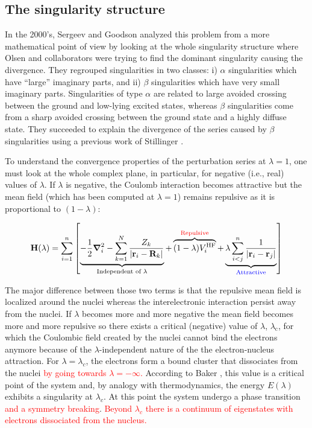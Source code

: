 \documentclass[11pt,a4paper]{article}
\newcommand{\titou}[1]{\textcolor{red}{#1}}
\newcommand{\bH}{\mathbf{H}}
\begin{document}
\subsection{The singularity structure}

In the 2000's, Sergeev and Goodson \cite{Sergeev_2005, Sergeev_2006} analyzed this problem from a more mathematical point of view by looking at the whole singularity structure where Olsen and collaborators were trying to find the dominant singularity causing the divergence. They regrouped singularities in two classes: i) $\alpha$ singularities which have ``large'' imaginary parts, and ii) $\beta$ singularities which have very small imaginary parts. Singularities of type $\alpha$ are related to large avoided crossing between the ground and low-lying excited states, whereas $\beta$ singularities come from a sharp avoided crossing between the ground state and a highly diffuse state. They succeeded to explain the divergence of the series caused by $\beta$ singularities using a previous work of Stillinger \cite{Stillinger_2000}. 

To understand the convergence properties of the perturbation series at $\lambda=1$, one must look at the whole complex plane, in particular, for negative (i.e., real) values of $\lambda$. If $\lambda$ is negative, the Coulomb interaction becomes attractive but the mean field (which has been computed at $\lambda = 1$) remains repulsive as it is proportional to $(1-\lambda)$:

\begin{equation}\label{eq:HamiltonianStillinger}
    \bH(\lambda)=\sum\limits_{i=1}^{n}\left[ \underbrace{-\frac{1}{2}\grad_i^2 - \sum\limits_{k=1}^{N} \frac{Z_k}{|\vb{r}_i-\vb{R}_k|}}_{\text{Independent of $\lambda$}} + \overbrace{(1-\lambda)V_i^{\text{HF}}}^{\textcolor{red}{\text{Repulsive}}}+\underbrace{\lambda\sum\limits_{i<j}^{n}\frac{1}{|\vb{r}_i-\vb{r}_j|}}_{\textcolor{blue}{\text{Attractive}}}  \right]
\end{equation}

The major difference between those two terms is that the repulsive mean field is localized around the nuclei whereas the interelectronic interaction persist away from the nuclei. If $\lambda$ becomes more and more negative the mean field becomes more and more repulsive so there exists a critical (negative) value of $\lambda$, $\lambda_\text{c}$, for which the Coulombic field created by the nuclei cannot bind the electrons anymore because of the $\lambda$-independent nature of the the electron-nucleus attraction. For $\lambda = \lambda_c$, the electrons form a bound cluster that dissociates from the nuclei \titou{by going towards $\lambda = -\infty$.} According to Baker \cite{Baker_1971}, this value is a critical point of the system and, by analogy with thermodynamics, the energy $E(\lambda)$ exhibits a singularity at $\lambda_c$. At this point the system undergo a phase transition \titou{and a symmetry breaking}. \titou{Beyond $\lambda_c$ there is a continuum of eigenstates with electrons dissociated from the nucleus.}
\end{document}
